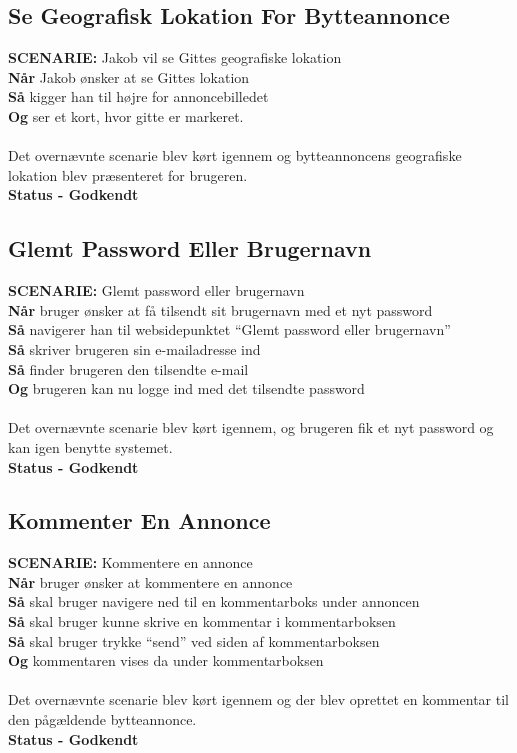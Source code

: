 \subsection{Se Geografisk Lokation For Bytteannonce}
{\color{blue}\textbf{SCENARIE:}} Jakob vil se Gittes geografiske lokation \\
{\color{blue}\textbf{Når}} Jakob ønsker at se Gittes lokation \\
{\color{blue}\textbf{Så}} kigger han til højre for annoncebilledet \\
{\color{blue}\textbf{Og}} ser et kort, hvor gitte er markeret.
\\ \\
Det overnævnte scenarie blev kørt igennem og bytteannoncens geografiske lokation blev  præsenteret for brugeren.\\
\textbf{Status - Godkendt}

\subsection{Glemt Password Eller Brugernavn}
{\color{blue}\textbf{SCENARIE:}} Glemt password eller brugernavn \\
{\color{blue}\textbf{Når}} bruger ønsker at få tilsendt sit brugernavn med et nyt password \\
{\color{blue}\textbf{Så}} navigerer han til websidepunktet  “Glemt password eller brugernavn” \\
{\color{blue}\textbf{Så}} skriver brugeren sin e-mailadresse ind\\
{\color{blue}\textbf{Så}} finder brugeren den tilsendte e-mail \\
{\color{blue}\textbf{Og}} brugeren kan nu logge ind med det tilsendte password
\\ \\
Det overnævnte scenarie blev kørt igennem, og brugeren fik et nyt password og kan igen benytte systemet. \\
\textbf{Status - Godkendt}

\subsection{Kommenter En Annonce}
{\color{blue}\textbf{SCENARIE:}} Kommentere en annonce \\
{\color{blue}\textbf{Når}} bruger ønsker at kommentere en annonce
\\
{\color{blue}\textbf{Så}} skal bruger navigere ned til en kommentarboks under annoncen \\
{\color{blue}\textbf{Så}} skal bruger kunne skrive en kommentar i kommentarboksen\\
{\color{blue}\textbf{Så}} skal bruger trykke “send” ved siden af kommentarboksen \\
{\color{blue}\textbf{Og}} kommentaren vises da under kommentarboksen
\\ \\
Det overnævnte scenarie blev kørt igennem og der blev oprettet en kommentar til den pågældende bytteannonce. \\
\textbf{Status - Godkendt}


